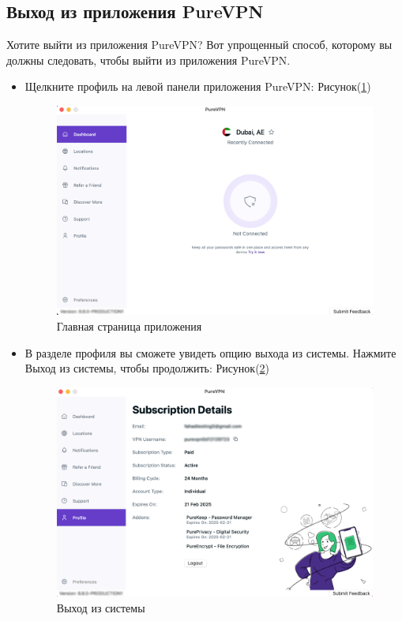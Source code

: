 \subsection{Выход из приложения PureVPN} 
Хотите выйти из приложения PureVPN? Вот упрощенный способ, которому вы должны следовать, чтобы выйти из приложения PureVPN.
\begin{itemize}
\item Щелкните профиль на левой панели приложения PureVPN:  Рисунок(\ref{fig:34})
\begin{figure}[H]
\includegraphics[width=12cm]{28.png}
\centering
\caption{Главная страница приложения}
\label{fig:34}
\end{figure}
\item В разделе профиля вы сможете увидеть опцию выхода из системы. Нажмите Выход из системы, чтобы продолжить:  Рисунок(\ref{fig:35})
\begin{figure}[H]
\includegraphics[width=12cm]{29.png}
\centering
\caption{Выход из системы}
\label{fig:35}
\end{figure}

\end{itemize}
